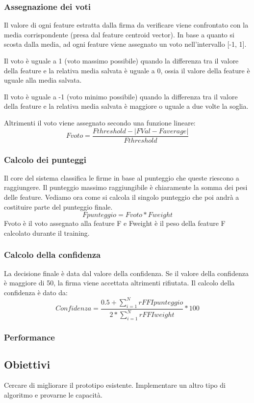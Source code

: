 \subsubsection*{Assegnazione dei voti}
\label{2.1.4.3}
Il valore di ogni feature estratta dalla firma da verificare viene confrontato con la media corrispondente (presa dal feature centroid vector). In base a quanto si scosta dalla media, ad ogni feature viene assegnato un voto nell'intervallo [-1, 1].

Il voto è uguale a 1 (voto massimo possibile) quando la differenza tra il valore della feature e la relativa media salvata è uguale a 0, ossia il valore della feature è uguale alla media salvata.

Il voto è uguale a -1 (voto minimo possibile) quando la differenza tra il valore della feature e la relativa media salvata è maggiore o uguale a due volte la soglia.

Altrimenti il voto viene assegnato secondo una funzione lineare:
\[Fvoto=\frac{Fthreshold-|FVal-Faverage|}{Fthreshold}\]
\subsubsection*{Calcolo dei punteggi}
\label{2.1.4.4}
Il core del sistema classifica le firme in base al punteggio che queste riescono a raggiungere. Il punteggio massimo raggiungibile è chiaramente la somma dei pesi delle feature. Vediamo ora come si calcola il singolo punteggio che poi andrà a costituire parte del punteggio finale.
\[Fpunteggio=Fvoto * Fweight\]
Fvoto è il voto assegnato alla feature F e Fweight è il peso della feature F calcolato durante il training.
\subsubsection*{Calcolo della confidenza}
\label{2.1.4.5}
La decisione finale è data dal valore della confidenza. Se il valore della confidenza è maggiore di 50, la firma viene accettata altrimenti rifiutata. Il calcolo della confidenza è dato da:
\[Confidenza = \frac{0.5+\sum\limits_{i=1}^NrF FIpunteggio}{2*\sum\limits_{i=1}^NrF FIweight} * 100\]
\subsubsection*{Performance}
\label{2.1.4.6}
\subsection{Obiettivi}
\label{2.2}
Cercare di migliorare il prototipo esistente. Implementare un altro tipo di algoritmo e provarne le capacità.
